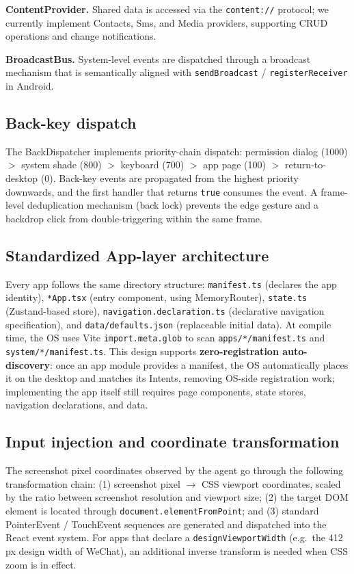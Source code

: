 \textbf{ContentProvider.} Shared data is accessed via the \texttt{content://} protocol; we currently implement Contacts, Sms, and Media providers, supporting CRUD operations and change notifications.

\textbf{BroadcastBus.} System-level events are dispatched through a broadcast mechanism that is semantically aligned with \texttt{sendBroadcast} / \texttt{registerReceiver} in Android.

\subsection{Back-key dispatch}

The BackDispatcher implements priority-chain dispatch: permission dialog (1000) $>$ system shade (800) $>$ keyboard (700) $>$ app page (100) $>$ return-to-desktop (0). Back-key events are propagated from the highest priority downwards, and the first handler that returns \texttt{true} consumes the event. A frame-level deduplication mechanism (back lock) prevents the edge gesture and a backdrop click from double-triggering within the same frame.

\subsection{Standardized App-layer architecture}

Every app follows the same directory structure: \texttt{manifest.ts} (declares the app identity), \texttt{*App.tsx} (entry component, using MemoryRouter), \texttt{state.ts} (Zustand-based store), \texttt{navigation.declaration.ts} (declarative navigation specification), and \texttt{data/defaults.json} (replaceable initial data). At compile time, the OS uses Vite \texttt{import.meta.glob} to scan \texttt{apps/*/manifest.ts} and \texttt{system/*/manifest.ts}. This design supports \textbf{zero-registration auto-discovery}: once an app module provides a manifest, the OS automatically places it on the desktop and matches its Intents, removing OS-side registration work; implementing the app itself still requires page components, state stores, navigation declarations, and data.

\subsection{Input injection and coordinate transformation}

The screenshot pixel coordinates observed by the agent go through the following transformation chain: (1) screenshot pixel $\to$ CSS viewport coordinates, scaled by the ratio between screenshot resolution and viewport size; (2) the target DOM element is located through \texttt{document.elementFromPoint}; and (3) standard PointerEvent / TouchEvent sequences are generated and dispatched into the React event system. For apps that declare a \texttt{designViewportWidth} (e.g.\ the 412\,px design width of WeChat), an additional inverse transform is needed when CSS zoom is in effect.

